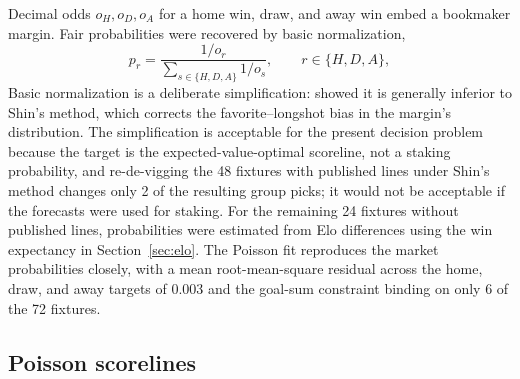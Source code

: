 \documentclass[11pt,letterpaper]{article}
\begin{document}
Decimal odds $o_H, o_D, o_A$ for a home win, draw, and away win embed a bookmaker margin. Fair probabilities were recovered by basic normalization,
\begin{equation}
p_r = \frac{1/o_r}{\sum_{s \in \{H,D,A\}} 1/o_s}, \qquad r \in \{H,D,A\},
\end{equation}
Basic normalization is a deliberate simplification: \citet{strumbelj2014} showed it is generally inferior to Shin's method, which corrects the favorite--longshot bias in the margin's distribution. The simplification is acceptable for the present decision problem because the target is the expected-value-optimal scoreline, not a staking probability, and re-de-vigging the 48 fixtures with published lines under Shin's method changes only 2 of the resulting group picks; it would not be acceptable if the forecasts were used for staking. For the remaining 24 fixtures without published lines, probabilities were estimated from Elo differences using the win expectancy in Section~\ref{sec:elo}. The Poisson fit reproduces the market probabilities closely, with a mean root-mean-square residual across the home, draw, and away targets of 0.003 and the goal-sum constraint binding on only 6 of the 72 fixtures.

\subsection{Poisson scorelines}
\end{document}
